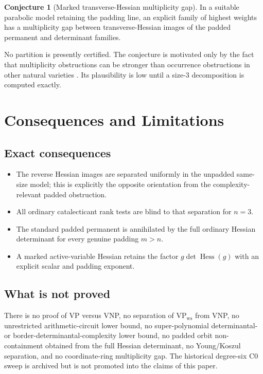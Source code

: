 \documentclass[11pt]{article}
\theoremstyle{definition}
\newtheorem{conjecture}[theorem]{Conjecture}
\theoremstyle{remark}
\DeclareMathOperator{\Hess}{Hess}
\begin{document}
\begin{conjecture}[Marked transverse-Hessian multiplicity gap]
In a suitable parabolic model retaining the padding line, an explicit family of
highest weights has a multiplicity gap between transverse-Hessian images of the
padded permanent and determinant families.
\end{conjecture}
No partition is presently certified.  The conjecture is motivated only by the
fact that multiplicity obstructions can be stronger than occurrence
obstructions in other natural varieties \cite{DIP2020}.  Its plausibility is
low until a size-$3$ decomposition is computed exactly.

\section{Consequences and Limitations}

\subsection{Exact consequences}

\begin{itemize}[leftmargin=2em]
\item The reverse Hessian images are separated uniformly in the unpadded
same-size model; this is explicitly the opposite orientation from the
complexity-relevant padded obstruction.
\item All ordinary catalecticant rank tests are blind to that separation for
$n=3$.
\item The standard padded permanent is annihilated by the full ordinary Hessian
determinant for every genuine padding $m>n$.
\item A marked active-variable Hessian retains the factor
$g\det\Hess(g)$ with an explicit scalar and padding exponent.
\end{itemize}

\subsection{What is not proved}

There is no proof of VP versus VNP, no separation of
$\mathrm{VP}_{\mathrm{ws}}$ from VNP, no unrestricted arithmetic-circuit lower
bound, no super-polynomial determinantal- or border-determinantal-complexity
lower bound, no padded orbit
non-containment obtained from the full Hessian determinant, no Young/Koszul
separation, and no coordinate-ring multiplicity gap.  The historical degree-six
C0 sweep is archived but is not promoted into the claims of this paper.
\end{document}
